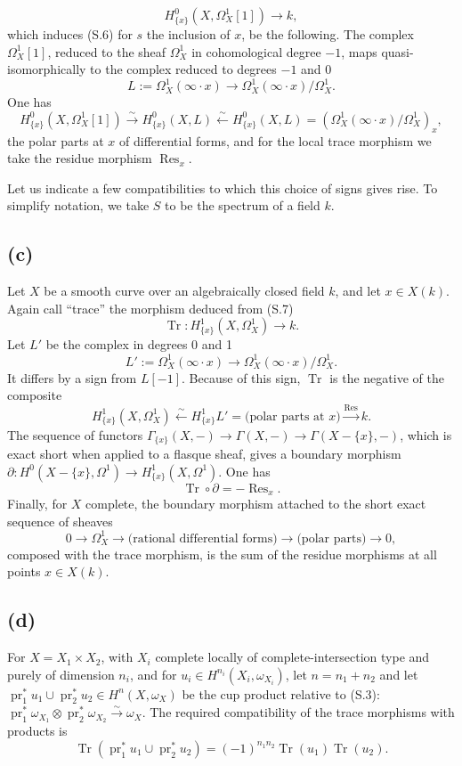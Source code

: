 \documentclass[11pt]{article}
\DeclareMathOperator{\Res}{Res}
\DeclareMathOperator{\Tr}{Tr}
\begin{document}
\begin{equation}
        H^0_{\{x\}}(X,\Omega^1_X[1])\longrightarrow k, \tag{S.7}
\end{equation}
which induces (S.6) for $s$ the inclusion of $x$, be the following. The complex $\Omega^1_X[1]$, reduced to the sheaf $\Omega^1_X$ in cohomological degree $-1$, maps quasi-isomorphically to the complex reduced to degrees $-1$ and 0
\[
        L:=\Omega^1_X(\infty\cdot x)\longrightarrow\Omega^1_X(\infty\cdot x)/\Omega^1_X.
\]
One has
\[
        H^0_{\{x\}}(X,\Omega^1_X[1])\xrightarrow{\sim}H^0_{\{x\}}(X,L)
        \xleftarrow{\sim}H^0_{\{x\}}(X,L)=(\Omega^1_X(\infty\cdot x)/\Omega^1_X)_x,
\]
the polar parts at $x$ of differential forms, and for the local trace morphism we take the residue morphism $\Res_x$.

Let us indicate a few compatibilities to which this choice of signs gives rise. To simplify notation, we take $S$ to be the spectrum of a field $k$.

\subsection*{(c)}
Let $X$ be a smooth curve over an algebraically closed field $k$, and let $x\in X(k)$. Again call ``trace'' the morphism deduced from (S.7)
\[
        \Tr:H^1_{\{x\}}(X,\Omega^1_X)\longrightarrow k.
\]
Let $L'$ be the complex in degrees 0 and 1
\[
        L':=\Omega^1_X(\infty\cdot x)\longrightarrow\Omega^1_X(\infty\cdot x)/\Omega^1_X.
\]
It differs by a sign from $L[-1]$. Because of this sign, $\Tr$ is the negative of the composite
\[
        H^1_{\{x\}}(X,\Omega^1_X)\xleftarrow{\sim}H^1_{\{x\}}L'
        =\text{(polar parts at }x)\xrightarrow{\Res}k.
\]
The sequence of functors $\Gamma_{\{x\}}(X,-)\to\Gamma(X,-)\to\Gamma(X-\{x\},-)$, which is exact short when applied to a flasque sheaf, gives a boundary morphism $\partial:H^0(X-\{x\},\Omega^1)\to H^1_{\{x\}}(X,\Omega^1)$. One has
\[
        \Tr\circ\partial=-\Res_x.
\]
Finally, for $X$ complete, the boundary morphism attached to the short exact sequence of sheaves
\[
        0\longrightarrow\Omega^1_X\longrightarrow\text{(rational differential forms)}
        \longrightarrow\text{(polar parts)}\longrightarrow0,
\]
composed with the trace morphism, is the sum of the residue morphisms at all points $x\in X(k)$.

\subsection*{(d)}
For $X=X_1\times X_2$, with $X_i$ complete locally of complete-intersection type and purely of dimension $n_i$, and for $u_i\in H^{n_i}(X_i,\omega_{X_i})$, let $n=n_1+n_2$ and let $\operatorname{pr}_1^*u_1\cup\operatorname{pr}_2^*u_2\in H^n(X,\omega_X)$ be the cup product relative to (S.3): $\operatorname{pr}_1^*\omega_{X_1}\otimes\operatorname{pr}_2^*\omega_{X_2}\xrightarrow{\sim}\omega_X$. The required compatibility of the trace morphisms with products is
\[
        \Tr(\operatorname{pr}_1^*u_1\cup\operatorname{pr}_2^*u_2)
        =(-1)^{n_1n_2}\Tr(u_1)\Tr(u_2).
\]
\end{document}
